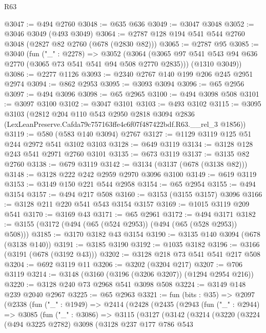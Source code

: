 \begin{lexlean}{R63}
\begin{coremodule}
@3047 := @494 @2760
@3048 := @635 @636
@3049 := @3047 @3048
@3052 := @3046 @3049 (@493 @3049)
@3064 := @2787 @128 @194 @541 @544 @2760 @3048 (@2827 @82 @2760 (@678 (@2830 @82)))
@3065 := @2787 @95
@3085 := @3040
    (fun ("_" : @2278) =>
    @3052
      (@3064 (@3065 @97 @541 @543 @94 @636 @2770 (@3065 @73 @541 @541 @94 @508 @2770 @2835)))
      (@1310 @3049))
@3086 := @2277 @1126
@3093 := @2340 @2767 @140 @199 @206 @245 @2951 @2974
@3094 := @862 @2953
@3095 := @3093 @3094
@3096 := @65 @2956
@3097 := @494 @3096
@3098 := @65 @2965
@3100 := @494 @3098 @508
@3101 := @3097 @3100
@3102 := @3047 @3101
@3103 := @493 @3102
@3115 := @3095
    @3103
    (@2812
      @204
      @110
      @543
      @2950
      @2818
      @3094
      @2836
      (LexLeanPreserve.Cafda79c757163ffe4c6f07f487422bdf.R63.__rel_3 @1856))
@3119 := @580 (@583 @140 @3094) @2767
@3127 := @1129 @3119 @125 @51 @244 @2972 @541 @3102 @3103
@3128 := @649 @3119
@3134 := @3128 @128 @243 @541 @2971 @2760 @3101
@3135 := @673 @3119
@3137 := @3135 @82 @2760
@3138 := @679 @3119
@3142 := @3134 (@3137 (@678 (@3138 @82)))
@3148 := @3128 @222 @242 @2959 @2970 @3096 @3100
@3149 := @619 @3119
@3153 := @3149 @150 @221 @544 @2958
@3154 := @65 @2954
@3155 := @494 @3154
@3157 := @494 @217 @508
@3160 := @3153 (@3155 @3157) @3096
@3166 := @3128 @211 @220 @541 @543 @3154 @3157
@3169 := @1015 @3119 @209 @541
@3170 := @3169 @43
@3171 := @65 @2961
@3172 := @494 @3171
@3182 := @3155 (@3172 (@494 (@65 (@524 @2953)) (@494 (@65 (@528 @2953)) @508)))
@3185 := @3170 @3182 @43 @3154
@3190 := @3135 @140 @3094 (@678 (@3138 @140))
@3191 := @3185 @3190
@3192 := @1035 @3182
@3196 := @3166 (@3191 (@678 (@3192 @43)))
@3202 := @3128 @218 @73 @541 @541 @217 @508
@3204 := @692 @3119 @11
@3206 := @3202 (@3204 @217)
@3207 := @706 @3119
@3214 := @3148 (@3160 (@3196 (@3206 @3207)) (@1294 @2954 @216))
@3220 := @3128 @240 @73 @2968 @541 @3098 @508
@3224 := @3149 @148 @239 @2040 @2967
@3225 := @65 @2963
@3321 := fun (bits : @35) =>
  @2097
    (@2338
      (fun ("_" : @1949) =>
      @2414
        (@2428
          (@2435
            (@2943
              (fun ("_" : @2944) =>
              @3085
                (fun ("_" : @3086) =>
                @3115
                  (@3127
                    (@3142
                      (@3214
                        (@3220
                          (@3224
                            (@494 @3225 @2782)
                            @3098
                            (@3128
                              @237
                              @177
                              @786
                              @543

\end{coremodule}
\end{lexlean}
